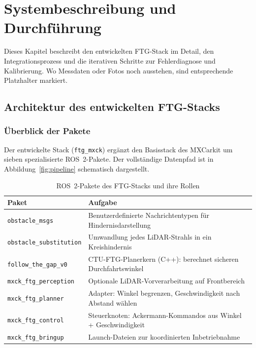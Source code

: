 \chapter{Systembeschreibung und Durchführung}
\label{ch:durchfuehrung}

Dieses Kapitel beschreibt den entwickelten FTG-Stack im Detail,
den Integrationsprozess und die iterativen Schritte zur Fehlerdiagnose
und Kalibrierung. Wo Messdaten oder Fotos noch ausstehen,
sind entsprechende Platzhalter markiert.

\section{Architektur des entwickelten FTG-Stacks}

\subsection{Überblick der Pakete}

Der entwickelte Stack (\texttt{ftg\_mxck}) ergänzt den Basisstack
des MXCarkit um sieben spezialisierte ROS~2-Pakete. Der vollständige
Datenpfad ist in Abbildung~\ref{fig:pipeline} schematisch dargestellt.

\label{fig:pipeline}

\begin{table}[H]
\centering
\caption{ROS~2-Pakete des FTG-Stacks und ihre Rollen}
\label{tab:pakete}
\begin{tabularx}{\textwidth}{lX}
\toprule
\textbf{Paket} & \textbf{Aufgabe} \\
\midrule
\texttt{obstacle\_msgs}       & Benutzerdefinierte Nachrichtentypen für Hindernisdarstellung \\
\texttt{obstacle\_substitution} & Umwandlung jedes LiDAR-Strahls in ein Kreishindernis \\
\texttt{follow\_the\_gap\_v0} & CTU-FTG-Planerkern (C++): berechnet sicheren Durchfahrtswinkel \\
\texttt{mxck\_ftg\_perception} & Optionale LiDAR-Vorverarbeitung auf Frontbereich \\
\texttt{mxck\_ftg\_planner}   & Adapter: Winkel begrenzen, Geschwindigkeit nach Abstand wählen \\
\texttt{mxck\_ftg\_control}   & Steuerknoten: Ackermann-Kommandos aus Winkel + Geschwindigkeit \\
\texttt{mxck\_ftg\_bringup}   & Launch-Dateien zur koordinierten Inbetriebnahme \\
\bottomrule
\end{tabularx}
\end{table}

